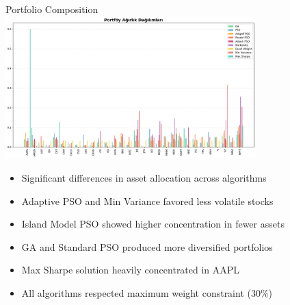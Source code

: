 \documentclass[aspectratio=169,xcolor=table]{beamer}
\begin{document}
\begin{frame}{Portfolio Composition}
  \centering
  \includegraphics[width=\textwidth, height=5.5cm, keepaspectratio]{portfolio_weights_comparison.png}
  
  \begin{tcolorbox}[
    enhanced,
    colback=blue!5,
    colframe=blue!70,
    arc=2mm,
    title=Analysis of Weight Distributions,
    fonttitle=\bfseries\large,
    boxrule=0.5mm
  ]
    \begin{itemize}
      \item Significant differences in asset allocation across algorithms
      \item Adaptive PSO and Min Variance favored less volatile stocks
      \item Island Model PSO showed higher concentration in fewer assets
      \item GA and Standard PSO produced more diversified portfolios
      \item Max Sharpe solution heavily concentrated in AAPL
      \item All algorithms respected maximum weight constraint (30\%)
    \end{itemize}
  \end{tcolorbox}
\end{frame}
\end{document}
